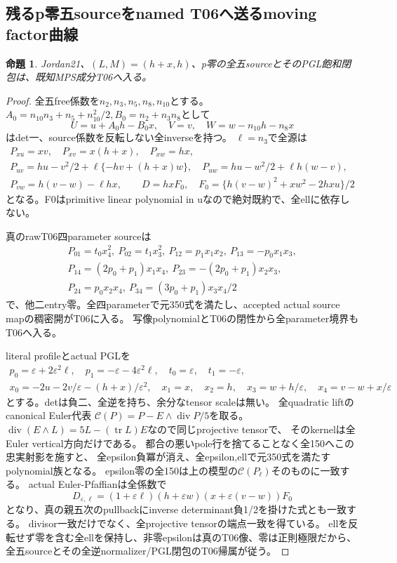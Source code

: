 \documentclass[a4paper,11pt]{ltjsarticle}
\newtheorem{proposition}{命題}[section]
\theoremstyle{definition}
\begin{document}
\subsection{残るp零五sourceをnamed T06へ送るmoving factor曲線}
\begin{proposition}\label{prop:two-hyperplanes-p0-all-T06}
Jordan21、$(L,M)=(h+x,h)$、p零の全五sourceとそのPGL飽和閉包は、既知MPS成分T06へ入る。
\end{proposition}
\begin{proof}
全五free係数を$n_2,n_3,n_5,n_8,n_{10}$とする。
$A_0=n_{10}n_3+n_5+n_{10}^2/2,B_0=n_2+n_3n_8$として
\[
 U=u+A_0h-B_0x,\quad V=v,\quad W=w-n_{10}h-n_8x
\]
はdet一、source係数を反転しない全inverseを持つ。
$\ell=n_3$で全源は
\[
\begin{gathered}
 P_{xu}=xv,\quad P_{xv}=x(h+x),\quad P_{xw}=hx,\\
 P_{uv}=hu-v^2/2+\ell\{-hv+(h+x)w\},\quad
 P_{uw}=hu-w^2/2+\ell h(w-v),\\
 P_{vw}=h(v-w)-\ell hx,\qquad
 D=hxF_0,\quad F_0=\{h(v-w)^2+xw^2-2hxu\}/2
\end{gathered}
\]
となる。F0はprimitive linear polynomial in uなので絶対既約で、全ellに依存しない。

真のrawT06四parameter sourceは
\[
\begin{gathered}
 P_{01}=t_0x_4^2,\ P_{02}=t_1x_3^2,\ P_{12}=p_1x_1x_2,\ P_{13}=-p_0x_1x_3,\\
 P_{14}=(2p_0+p_1)x_1x_4,\ P_{23}=-(2p_0+p_1)x_2x_3,\\
 P_{24}=p_0x_2x_4,\ P_{34}=(3p_0+p_1)x_3x_4/2
\end{gathered}
\]
で、他二entry零。全四parameterで元350式を満たし、accepted actual source mapの稠密開がT06に入る。
写像polynomialとT06の閉性から全parameter境界もT06へ入る。

literal profileとactual PGLを
\[
\begin{gathered}
 p_0=\varepsilon+2\varepsilon^2\ell,\quad p_1=-\varepsilon-4\varepsilon^2\ell,
 \quad t_0=\varepsilon,\quad t_1=-\varepsilon,\\
 x_0=-2u-2v/\varepsilon-(h+x)/\varepsilon^2,\quad
 x_1=x,\quad x_2=h,\quad x_3=w+h/\varepsilon,\quad x_4=v-w+x/\varepsilon
\end{gathered}
\]
とする。detは負二、全逆を持ち、余分なtensor scaleは無い。
全quadratic liftのcanonical Euler代表
$\mathcal C(P)=P-E\wedge\operatorname{div}P/5$を取る。
$\operatorname{div}(E\wedge L)=5L-(\operatorname{tr}L)E$なので同じprojective tensorで、
そのkernelは全Euler vertical方向だけである。
都合の悪いpole行を捨てることなく全150へこの忠実射影を施すと、
全epsilon負冪が消え、全epsilon,ellで元350式を満たすpolynomial族となる。
epsilon零の全150は上の模型の$\mathcal C(P_\ell)$そのものに一致する。
actual Euler-Pfaffianは全係数で
\[
 D_{\varepsilon,\ell}=(1+\varepsilon\ell)(h+\varepsilon w)
    (x+\varepsilon(v-w))F_0
\]
となり、真の親五次のpullbackにinverse determinant負1/2を掛けた式とも一致する。
divisor一致だけでなく、全projective tensorの端点一致を得ている。
ellを反転せず零を含む全ellを保持し、非零epsilonは真のT06像、零は正則極限だから、
全五sourceとその全逆normalizer/PGL閉包のT06帰属が従う。
\end{proof}
\end{document}
